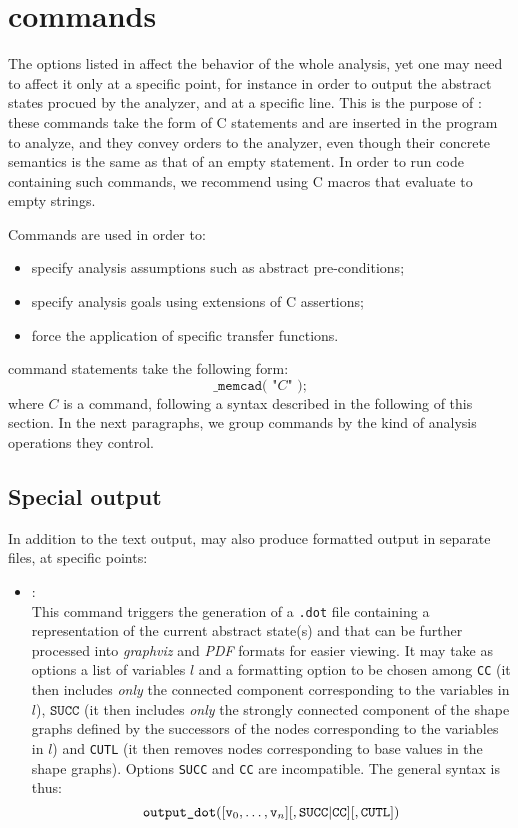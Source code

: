 \section{\memcad commands}
\label{s:3:2:commands}
The options listed in  affect the behavior of the
whole analysis, yet one may need to affect it only at a specific point,
for instance in order to output the abstract states procued by the
analyzer, and at a specific line.
This is the purpose of :
these commands take the form of C statements and are inserted in the
program to analyze, and they convey orders to the analyzer, even though
their concrete semantics is the same as that of an empty statement.
In order to run code containing such commands, we recommend using C
macros that evaluate to empty strings.

Commands are used in order to:
\begin{itemize}
\item specify analysis assumptions such as abstract pre-conditions;
\item specify analysis goals using extensions of C assertions;
\item force the application of specific transfer functions.
\end{itemize}
\memcad command statements take the following form:
\[
\texttt{_memcad( "} C \texttt{" );}
\]
where \( C \) is a command, following a syntax described in the
following of this section.
In the next paragraphs, we group commands by the kind of analysis
operations they control.

\subsection{Special output}
In addition to the text output, \memcad may also produce formatted
output in separate files, at specific points:
\begin{itemize}
\item[\dcommand{output\_dot}]: \\
  This command triggers the generation of a \texttt{.dot} file containing
  a representation of the current abstract state(s) and that can be
  further processed into {\em graphviz} and {\em PDF} formats for
  easier viewing.
  It may take as options a list of variables \( l \) and a formatting
  option to be chosen among \texttt{CC} (it then includes {\em only}
  the connected component corresponding to the variables in \( l \)),
  \( \texttt{SUCC} \) (it then includes {\em only} the strongly connected
  component of the shape graphs defined by the successors of the nodes
  corresponding to the variables in \( l \)) and \texttt{CUTL} (it then
  removes nodes corresponding to base values in the shape graphs).
  Options \texttt{SUCC} and \texttt{CC} are incompatible.
  The general syntax is thus:
  \[
  \texttt{output\_dot}( [ \texttt{v}_0, \ldots, \texttt{v}_n ]
  [, \texttt{SUCC} | \texttt{CC} ] [, \texttt{CUTL} ] )
  \]
\end{itemize}


